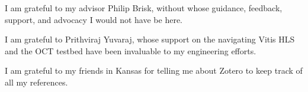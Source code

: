 I am grateful to my advisor Philip Brisk, without whose guidance, feedback,
support, and advocacy I would not have be here.

I am grateful to Prithviraj Yuvaraj, whose support on the navigating Vitis HLS
and the OCT testbed have been invaluable to my engineering efforts.

I am grateful to my friends in Kansas for telling me about Zotero to keep track
of all my references.
